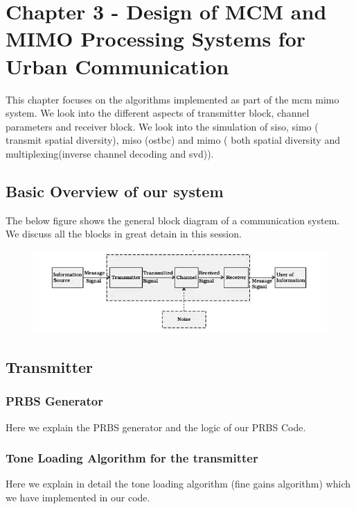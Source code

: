 \chapter{Chapter 3 - Design of MCM and MIMO Processing Systems for Urban Communication}

This chapter focuses on the algorithms implemented as part of the \acrshort{mcm} \acrshort{mimo} system. We look into the different aspects of transmitter block, channel parameters and receiver block. We look into the simulation of \acrshort{siso}, \acrshort{simo} ( transmit \gls{spatial diversity}), \acrshort{miso} (\acrshort{ostbc}) and \acrshort{mimo} ( both \gls{spatial diversity} and multiplexing(inverse channel decoding and \acrshort{svd})). 
 
\section{Basic Overview of our system}

The below figure shows the general block diagram of a communication system. We discuss all the blocks in great detain in this session.

\begin{figure}[!htbp]
\centering
\includegraphics[scale=1]{Chapter 3/Figures/Block system}
\label{fig:general block digram}
\end{figure}

\section{Transmitter}

\subsection{PRBS Generator}
Here we explain the PRBS generator and the logic of our PRBS Code.

\subsection{Tone Loading Algorithm for the transmitter}
Here we explain in detail the tone loading algorithm (fine gains algorithm) which we have implemented in our code.

